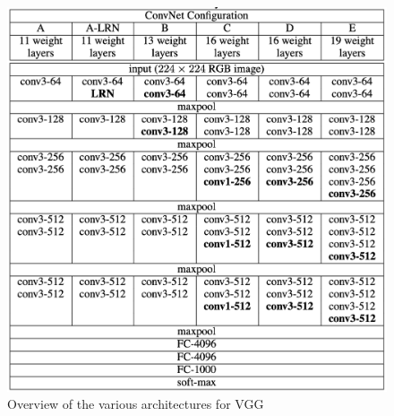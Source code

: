 \begin{figure}[htb]
    \centering
    \includegraphics[scale = 0.5]{img/vgg_arch.png}
    \caption[Overview of the various architectures for VGG]{Overview of the various architectures for VGG \cite{simonyan2015deep}}
    \label{fig:vgg_arch}
\end{figure}








